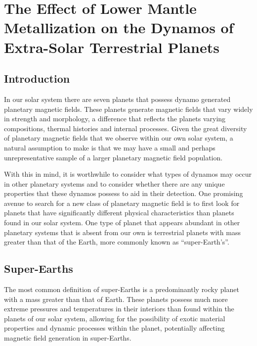 
\chapter{The Effect of Lower Mantle Metallization on the Dynamos of Extra-Solar Terrestrial Planets}
\label{chap:superearth}

\section{Introduction}
In our solar system there are seven planets that possess dynamo generated planetary magnetic fields. These planets generate magnetic fields that vary widely in strength and morphology, a difference that reflects the planets varying compositions, thermal histories and internal processes. Given the great diversity of planetary magnetic fields that we observe within our own solar system, a natural assumption to make is that we may have a small and perhaps unrepresentative sample of a larger planetary magnetic field population.

With this in mind, it is worthwhile to consider what types of dynamos may occur in other planetary systems and to consider whether there are any unique  properties that these dynamos possess to aid in their detection. One promising avenue to search for a new class of planetary magnetic field is to first look for planets that have significantly different physical characteristics than planets found in our solar system. One type of planet that appears abundant in other planetary systems that is absent from our own is terrestrial planets with mass greater than that of the Earth, more commonly known as ``super-Earth's''. 

\section{Super-Earths}
The most common definition of super-Earths is a predominantly rocky planet with a mass greater than that of Earth. These planets possess much more extreme pressures and temperatures in their interiors than found within the planets of our solar system, allowing for the possibility of exotic material properties and dynamic processes within the planet, potentially affecting magnetic field generation in super-Earths. 

